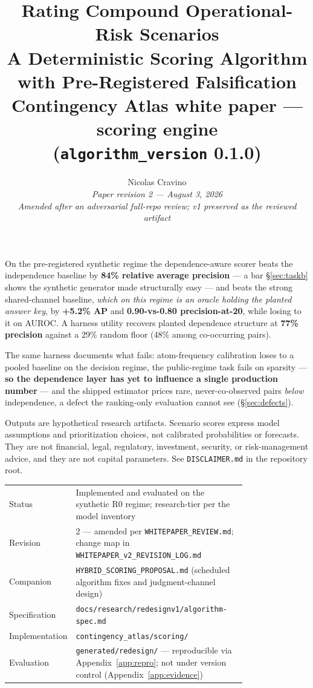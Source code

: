 \documentclass[11pt]{article}
\title{%
  \vspace{-0.5cm}%
  {\color{darkblue}\LARGE\bfseries Rating Compound Operational-Risk Scenarios}\\[6pt]
  {\color{darkred}\Large\bfseries A Deterministic Scoring Algorithm\\ with Pre-Registered Falsification}\\[10pt]
  {\large\normalfont Contingency Atlas white paper --- scoring engine\\
   (\texttt{algorithm\_version} 0.1.0)}
}
\author{%
  Nicolas Cravino\\
  \small\textit{Paper revision 2 --- August 3, 2026}\\[6pt]
  \small\textit{Amended after an adversarial full-repo review; v1 preserved as the reviewed artifact}
}
\date{}
\begin{document}
\maketitle

\begin{tcolorbox}[title=Key Findings --- stated the way a validator would state them]
On the pre-registered synthetic regime the dependence-aware scorer beats the
independence baseline by \textbf{84\% relative average precision} --- a bar
\S\ref{sec:taskb} shows the synthetic generator made structurally easy ---
and beats the strong shared-channel baseline, \emph{which on this regime is
an oracle holding the planted answer key}, by \textbf{+5.2\% AP} and
\textbf{0.90-vs-0.80 precision-at-20}, while losing to it on AUROC. A
harness utility recovers planted dependence structure at \textbf{77\%
precision} against a 29\% random floor (48\% among co-occurring pairs).

The same harness documents what fails: atom-frequency calibration loses to a
pooled baseline on the decision regime, the public-regime task fails on
sparsity --- \textbf{so the dependence layer has yet to influence a single
production number} --- and the shipped estimator prices rare,
never-co-observed pairs \emph{below} independence, a defect the ranking-only
evaluation cannot see (\S\ref{sec:defects}).
\end{tcolorbox}

\begin{tcolorbox}[title=Disclaimer, colframe=darkred, colback=red!4]
Outputs are hypothetical research artifacts. Scenario scores express model
assumptions and prioritization choices, not calibrated probabilities or
forecasts. They are not financial, legal, regulatory, investment, security,
or risk-management advice, and they are not capital parameters. See
\texttt{DISCLAIMER.md} in the repository root.
\end{tcolorbox}

\begin{center}\small
\begin{tabular}{@{}lp{0.78\linewidth}@{}}
\toprule
Status & Implemented and evaluated on the synthetic R0 regime; research-tier per the model inventory \\
Revision & 2 --- amended per \texttt{WHITEPAPER\_REVIEW.md}; change map in \texttt{WHITEPAPER\_v2\_REVISION\_LOG.md} \\
Companion & \texttt{HYBRID\_SCORING\_PROPOSAL.md} (scheduled algorithm fixes and judgment-channel design) \\
Specification & \texttt{docs/research/redesignv1/algorithm-spec.md} \\
Implementation & \texttt{contingency\_atlas/scoring/} \\
Evaluation & \texttt{generated/redesign/} --- reproducible via Appendix~\ref{app:repro}; not under version control (Appendix~\ref{app:evidence}) \\
\bottomrule
\end{tabular}
\end{center}
\end{document}

